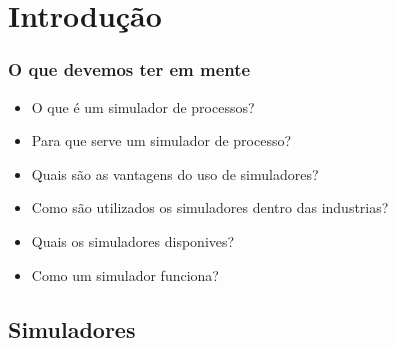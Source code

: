 \documentclass[aspectratio=169]{beamer}
\begin{document}
\section{Introdução}
\begin{frame}
	\frametitle{O que devemos ter em mente}
	\begin{itemize}
		\item O que é um simulador de processos?
		\item Para que serve um simulador de processo?
		\item Quais são as vantagens do uso de simuladores?
		\item Como são utilizados os simuladores dentro das industrias?
		\item Quais os simuladores disponives? 
		\item Como um simulador funciona?
	\end{itemize}
\end{frame}

\subsection{Simuladores}
\end{document}
